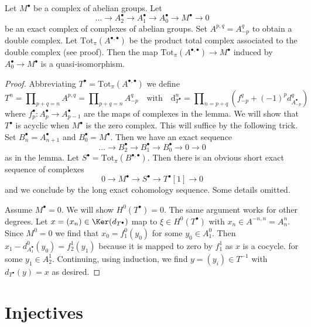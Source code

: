 \begin{lemma}
\label{lemma-resolution-gives-qis}
Let $M^\bullet$ be a complex of abelian groups. Let
$$
\ldots \to A_2^\bullet \to A_1^\bullet \to A_0^\bullet \to M^\bullet \to 0
$$
be an exact complex of complexes of abelian groups. Set $A^{p, q} = A_{-p}^q$
to obtain a double complex. Let $\text{Tot}_\pi(A^{\bullet, \bullet})$
be the product total complex associated to the double complex (see proof).
Then the map $\text{Tot}_\pi(A^{\bullet, \bullet}) \to M^\bullet$
induced by $A_0^\bullet \to M^\bullet$ is a quasi-isomorphism.
\end{lemma}

\begin{proof}
Abbreviating $T^\bullet = \text{Tot}_\pi(A^{\bullet, \bullet})$
we define
$$
T^n = \prod\nolimits_{p + q = n} A^{p, q} =
\prod\nolimits_{p + q = n} A_{-p}^q
\quad\text{with}\quad
\text{d}_{T^\bullet}^n =
\prod\nolimits_{n = p + q} (f_{-p}^q + (-1)^pd_{A_{-p}^\bullet}^q)
$$
where $f_p^\bullet : A_p^\bullet \to A_{p - 1}^\bullet$
are the maps of complexes in the lemma.
We will show that $T^\bullet$ is acyclic when
$M^\bullet$ is the zero complex. This will suffice by
the following trick. Set $B_n^\bullet = A_{n + 1}^\bullet$
and $B_0^\bullet = M^\bullet$. Then we have an exact sequence
$$
\ldots \to B_2^\bullet \to B_1^\bullet \to B_0^\bullet \to 0 \to 0
$$
as in the lemma. Let $S^\bullet = \text{Tot}_\pi(B^{\bullet, \bullet})$.
Then there is an obvious short exact sequence of complexes
$$
0 \to M^\bullet \to S^\bullet \to T^\bullet[1] \to 0
$$
and we conclude by the long exact cohomology sequence. Some details omitted.

\medskip\noindent
Assume $M^\bullet = 0$. We will show $H^0(T^\bullet) = 0$. The same argument
works for other degrees. Let $x =(x_n) \in \Ker(d_{T^\bullet})$
map to $\xi \in H^0(T^\bullet)$ with $x_n \in A^{-n, n} = A_n^n$.
Since $M^0 = 0$ we find that $x_0 = f_1^0(y_0)$ for some $y_0 \in A_1^0$.
Then $x_1 - d^0_{A_1^\bullet}(y_0) = f_2^1(y_1)$
because it is mapped to zero by $f_1^1$ as $x$ is a cocycle.
for some $y_1 \in A_2^1$. Continuing, using induction, we find
$y = (y_i) \in T^{-1}$ with $d_{T^\bullet}(y) = x$ as desired.
\end{proof}







\section{Injectives}
\label{section-injectives}

